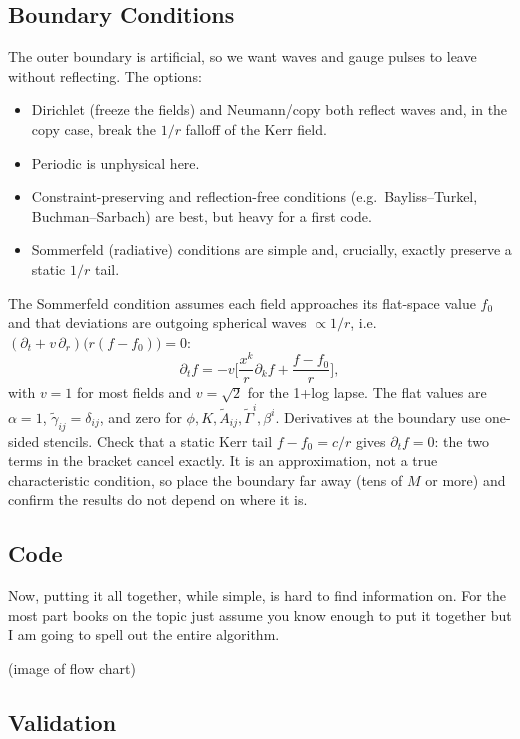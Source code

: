 \subsection{Boundary Conditions}
The outer boundary is artificial, so we want waves and gauge pulses to leave without
reflecting. The options:
\begin{itemize}
	\item Dirichlet (freeze the fields) and Neumann/copy both reflect waves and, in the
	      copy case, break the $1/r$ falloff of the Kerr field.
	\item Periodic is unphysical here.
	\item Constraint-preserving and reflection-free conditions (e.g.\ Bayliss--Turkel,
	      Buchman--Sarbach) are best, but heavy for a first code.
	\item Sommerfeld (radiative) conditions are simple and, crucially, exactly preserve
	      a static $1/r$ tail.
\end{itemize}
The Sommerfeld condition assumes each field approaches its flat-space value $f_0$ and
that deviations are outgoing spherical waves $\propto1/r$, i.e.\ $(\partial_t+v\,\partial_r)\big(r(f-f_0)\big)=0$:
\[
	\partial_tf=-v\Big[\frac{x^k}{r}\partial_kf+\frac{f-f_0}{r}\Big],
\]
with $v=1$ for most fields and $v=\sqrt2$ for the 1+log lapse. The flat values are
$\alpha=1$, $\tilde\gamma_{ij}=\delta_{ij}$, and zero for $\phi,K,\tilde A_{ij},\tilde\Gamma^i,\beta^i$.
Derivatives at the boundary use one-sided stencils. Check that a static Kerr
tail $f-f_0=c/r$ gives $\partial_tf=0$: the two terms in the bracket cancel exactly.
It is an approximation, not a true characteristic condition, so place the boundary far away
(tens of $M$ or more) and confirm the results do not depend on where it is.




\subsection{Code}

Now, putting it all together, while simple, is hard to find information on. For the most part books on the topic just assume you know enough to put it together but I am going to spell out the entire algorithm.

(image of flow chart)

\subsection{Validation}

